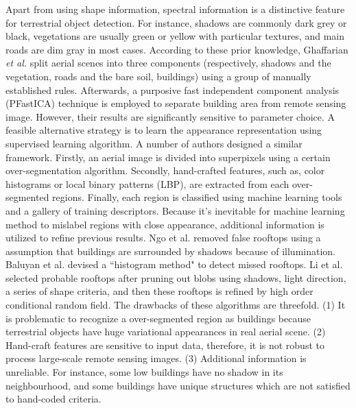 \documentclass[runningheads]{llncs}
\begin{document}
   Apart from using shape information, spectral information is a distinctive feature for  terrestrial object detection. For instance, shadows are commonly dark grey or black, vegetations are usually green or yellow with particular textures, and main roads are dim gray in most cases. According to these prior knowledge, Ghaffarian \textit{et al.} \cite{ghaffarian2014automaticPFICA} split aerial scenes into three components (respectively, shadows and the vegetation, roads and the bare soil, buildings) using a group of manually established rules. Afterwards, a purposive fast independent component analysis (PFastICA) technique is employed to separate building area from remote sensing image. However, their results are significantly sensitive to parameter choice. A feasible alternative strategy is to learn the appearance representation using  supervised learning algorithm. A number of authors \cite{chen2014shadow,ngoautomatic,baluyan2013novel,dornaika2015object} designed a similar framework. Firstly, an aerial image is divided into superpixels using  a certain over-segmentation algorithm. Secondly, hand-crafted features, such as, color histograms or local binary patterns (LBP), are extracted from each over-segmented regions. Finally, each region is classified using machine learning tools and a gallery of training descriptors.  Because it's inevitable for machine learning method to mislabel regions with close appearance, additional information is utilized to refine previous results. Ngo et
al. \cite{ngoautomatic} removed false rooftops using a assumption that buildings are surrounded by shadows because of illumination. Baluyan et al. \cite{baluyan2013novel} devised a ``histogram method" to detect missed rooftops. Li et al. \cite{li2015robust} selected probable rooftops after pruning out blobs using shadows, light direction, a series of shape criteria, and then these rooftops is refined by high order conditional random field. The drawbacks of these algorithms are threefold. (1) It is problematic to recognize a over-segmented region as buildings because terrestrial objects have huge variational appearances in real aerial scene. (2) Hand-craft features are sensitive to input data, therefore, it is not robust to process large-scale remote sensing images. (3) Additional information is unreliable. For instance, some low buildings have no shadow in its neighbourhood, and some buildings have unique structures which are not satisfied to hand-coded criteria. 
\end{document}
